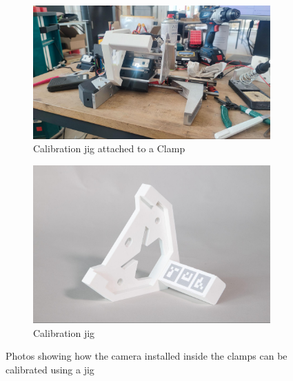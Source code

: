 \begin{figure}[!h]
    \centering
    \begin{subfigure}[b]{0.49\textwidth}
        \centering
        \includegraphics[width=\textwidth]{images/08/img17.jpg}
        \caption{Calibration jig attached to a Clamp}
    \end{subfigure}
    \hfill
    \begin{subfigure}[b]{0.49\textwidth}
        \centering
        \includegraphics[width=\textwidth]{images/08/img18.jpg}
        \caption{Calibration jig}
    \end{subfigure}
    \caption{Photos showing how the camera installed inside the clamps can be calibrated using a jig}
    \label{fig:calibration-setup-for-camera-assembly}
\end{figure}

